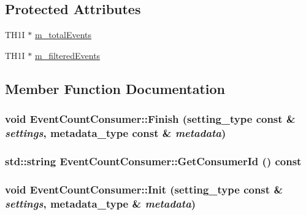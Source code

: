 \subsection*{Protected Attributes}
\begin{DoxyCompactItemize}
\item 
TH1I $\ast$ \hyperlink{classEventCountConsumer_a8fb9d1d62cab36dd76967af15061ece7}{m\_\-totalEvents}
\item 
TH1I $\ast$ \hyperlink{classEventCountConsumer_a5b23dafc4a1424978b7ebfbaabf9a160}{m\_\-filteredEvents}
\end{DoxyCompactItemize}


\subsection{Member Function Documentation}
\hypertarget{classEventCountConsumer_a47a2bedb3b15c3b17de77d66696d6b34}{
\subsubsection[{Finish}]{\setlength{\rightskip}{0pt plus 5cm}void EventCountConsumer::Finish (setting\_\-type const \& {\em settings}, \/  metadata\_\-type const \& {\em metadata})}}
\label{classEventCountConsumer_a47a2bedb3b15c3b17de77d66696d6b34}
\hypertarget{classEventCountConsumer_a15515cd0d7c02f86003c8afbe6bc67fc}{
\subsubsection[{GetConsumerId}]{\setlength{\rightskip}{0pt plus 5cm}std::string EventCountConsumer::GetConsumerId () const}}
\label{classEventCountConsumer_a15515cd0d7c02f86003c8afbe6bc67fc}
\hypertarget{classEventCountConsumer_a2d04b40136bd826a4a004eb36c3354aa}{
\subsubsection[{Init}]{\setlength{\rightskip}{0pt plus 5cm}void EventCountConsumer::Init (setting\_\-type const \& {\em settings}, \/  metadata\_\-type \& {\em metadata})}}
